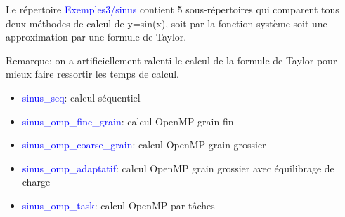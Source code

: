 \documentclass{beamer}
\begin{document}
\begin{frame}
	Le répertoire \textcolor{blue}{Exemples3/sinus} contient 5 sous-répertoires
	qui comparent tous deux méthodes de calcul de y=sin(x), soit par la fonction système soit une approximation par une formule de Taylor.
	\medskip
	
	Remarque: on a artificiellement ralenti le calcul de la formule de Taylor pour mieux faire ressortir les temps de calcul.
	
	\begin{itemize}
		\item \textcolor{blue}{sinus\_seq}: calcul séquentiel
		\item \textcolor{blue}{sinus\_omp\_fine\_grain}: calcul OpenMP grain fin
		\item \textcolor{blue}{sinus\_omp\_coarse\_grain}: calcul OpenMP grain grossier
		\item \textcolor{blue}{sinus\_omp\_adaptatif}: calcul OpenMP grain grossier avec équilibrage de charge
		\item \textcolor{blue}{sinus\_omp\_task}: calcul OpenMP par tâches
	\end{itemize}

\vfill

\end{frame}

\begin{frame}

\end{frame}
\end{document}
